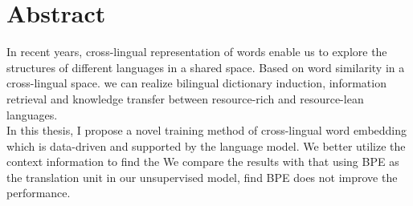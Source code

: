 \chapter{Abstract}
In recent years, cross-lingual representation of words enable us to explore the structures of different languages in a shared space. Based on word similarity in a cross-lingual space. we can realize bilingual dictionary induction, information retrieval and knowledge transfer between resource-rich and resource-lean languages.\\
In this thesis, I propose a novel training method of cross-lingual word embedding which is data-driven and supported by the language model. We better utilize the context information to find the 
We compare the results with that using BPE as the translation unit in our unsupervised model, find  BPE does not improve the performance.   




